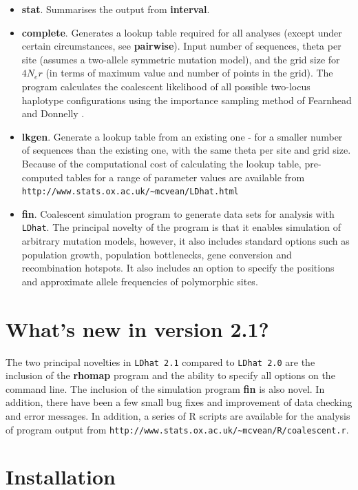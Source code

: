 \documentclass[a4paper,10pt,fullpage]{article}
\begin{document}
\begin{itemize}
\item {\bf stat}.  Summarises the output from {\bf interval}. 

\item {\bf complete}.  Generates a lookup table required for all
analyses (except under certain circumstances, see {\bf pairwise}).
Input number of sequences, theta per site (assumes a two-allele
symmetric mutation model), and the grid size for $4N_er$ (in terms
of maximum value and number of points in the grid).  The program
calculates the coalescent likelihood of all possible two-locus
haplotype configurations using the importance sampling method of
Fearnhead and Donnelly \cite{FearnheadDonnelly01}.

\item {\bf lkgen}. Generate a lookup table from an existing one -
for a smaller number of sequences than the existing one, with the
same theta per site and grid size. Because of the computational
cost of calculating the lookup table, pre-computed tables for a
range of parameter values are available from
\verb+http://www.stats.ox.ac.uk/~mcvean/LDhat.html+

\item {\bf fin}.  Coalescent simulation program to generate data sets for analysis with \verb+LDhat+.  The principal novelty of the program is that it enables simulation of arbitrary mutation models, however, it also includes standard options such as population growth, population bottlenecks, gene conversion and recombination hotspots.  It also includes an option to specify the positions and approximate allele frequencies of polymorphic sites.

\end{itemize}

\section{What's new in version 2.1?}

The two principal novelties in \verb+LDhat 2.1+ compared to \verb+LDhat 2.0+ are the inclusion of the {\bf rhomap} program \cite{AutonMcVean07} and the ability to specify all options on the command line.  The inclusion of the simulation program {\bf fin} is also novel.  In addition, there have been a few small bug fixes and improvement of data checking and error messages.  In addition, a series of R scripts are available for the analysis of program output from \verb+http://www.stats.ox.ac.uk/~mcvean/R/coalescent.r+.


\section{Installation}
\end{document}
